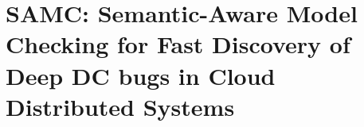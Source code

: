 \chapter{SAMC: Semantic-Aware Model Checking for Fast Discovery of Deep DC bugs in Cloud Distributed Systems}
\label{chp-samc}








